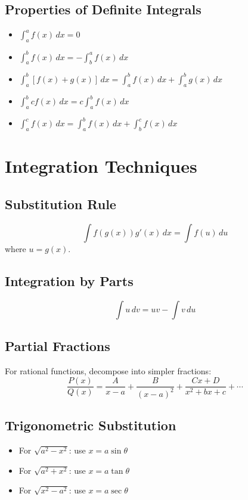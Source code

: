 \documentclass[11pt]{article}
\begin{document}
\subsection{Properties of Definite Integrals}
\begin{itemize}
    \item $\int_a^a f(x) \, dx = 0$
    \item $\int_a^b f(x) \, dx = -\int_b^a f(x) \, dx$
    \item $\int_a^b [f(x) + g(x)] \, dx = \int_a^b f(x) \, dx + \int_a^b g(x) \, dx$
    \item $\int_a^b cf(x) \, dx = c\int_a^b f(x) \, dx$
    \item $\int_a^c f(x) \, dx = \int_a^b f(x) \, dx + \int_b^c f(x) \, dx$
\end{itemize}

\section{Integration Techniques}

\subsection{Substitution Rule}
$$\int f(g(x))g'(x) \, dx = \int f(u) \, du$$
where $u = g(x)$.

\subsection{Integration by Parts}
$$\int u \, dv = uv - \int v \, du$$

\subsection{Partial Fractions}
For rational functions, decompose into simpler fractions:
$$\frac{P(x)}{Q(x)} = \frac{A}{x-a} + \frac{B}{(x-a)^2} + \frac{Cx+D}{x^2+bx+c} + \cdots$$

\subsection{Trigonometric Substitution}
\begin{itemize}
    \item For $\sqrt{a^2-x^2}$: use $x = a\sin\theta$
    \item For $\sqrt{a^2+x^2}$: use $x = a\tan\theta$
    \item For $\sqrt{x^2-a^2}$: use $x = a\sec\theta$
\end{itemize}
\end{document}
